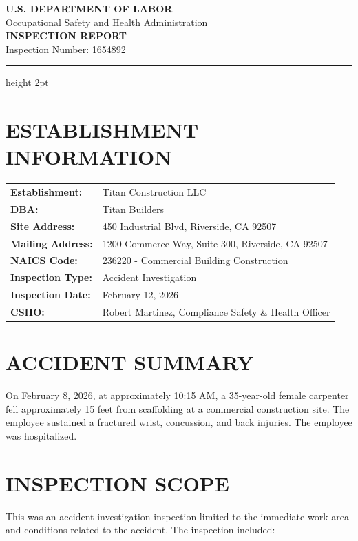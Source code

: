 \documentclass[11pt]{article}
\begin{document}
\begin{center}
{\Large\bfseries U.S. DEPARTMENT OF LABOR}\\
{\large Occupational Safety and Health Administration}\\[1em]
{\LARGE\bfseries INSPECTION REPORT}\\[0.5em]
{\large Inspection Number: 1654892}
\end{center}

\vspace{1em}
\hrule height 2pt
\vspace{1em}

\section*{ESTABLISHMENT INFORMATION}

\begin{tabular}{@{}p{4.5cm}p{10cm}@{}}
\textbf{Establishment:} & Titan Construction LLC \\
\textbf{DBA:} & Titan Builders \\
\textbf{Site Address:} & 450 Industrial Blvd, Riverside, CA 92507 \\
\textbf{Mailing Address:} & 1200 Commerce Way, Suite 300, Riverside, CA 92507 \\
\textbf{NAICS Code:} & 236220 - Commercial Building Construction \\
\textbf{Inspection Type:} & Accident Investigation \\
\textbf{Inspection Date:} & February 12, 2026 \\
\textbf{CSHO:} & Robert Martinez, Compliance Safety \& Health Officer \\
\end{tabular}

\section*{ACCIDENT SUMMARY}

On February 8, 2026, at approximately 10:15 AM, a 35-year-old female carpenter fell approximately 15 feet from scaffolding at a commercial construction site. The employee sustained a fractured wrist, concussion, and back injuries. The employee was hospitalized.

\section*{INSPECTION SCOPE}

This was an accident investigation inspection limited to the immediate work area and conditions related to the accident. The inspection included:
\end{document}
